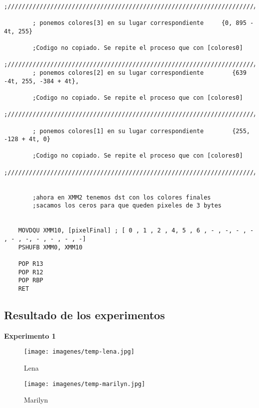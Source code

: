 \begin{codesnippet}
\begin{verbatim}
	;///////////////////////////////////////////////////////////////////////////////

        ; ponemos colores[3] en su lugar correspondiente     {0, 895 - 4t, 255}

        ;Codigo no copiado. Se repite el proceso que con [colores0]
	;//////////////////////////////////////////////////////////////////////////////
        ; ponemos colores[2] en su lugar correspondiente		{639 -4t, 255, -384 + 4t},	

        ;Codigo no copiado. Se repite el proceso que con [colores0]
	;///////////////////////////////////////////////////////////////////////////////

        ; ponemos colores[1] en su lugar correspondiente		{255, -128 + 4t, 0}

        ;Codigo no copiado. Se repite el proceso que con [colores0]
	;///////////////////////////////////////////////////////////////////////////////	
    
    
        ;ahora en XMM2 tenemos dst con los colores finales
        ;sacamos los ceros para que queden pixeles de 3 bytes
        
        
    MOVDQU XMM10, [pixelFinal] ; [ 0 , 1 , 2 , 4, 5 , 6 , - , -, - , - , - , -, - , - , - , -]
    PSHUFB XMM0, XMM10
    
    POP R13
    POP R12
    POP RBP
    RET
\end{verbatim}
\end{codesnippet}

\subsection{Resultado de los experimentos}
\vspace*{0.3cm} \noindent
\textbf{Experimento 1}

\begin{figure}
  \begin{center}
	\texttt{[image: imagenes/temp-lena.jpg]}
	\caption{Lena}
	\label{Lena}
  \end{center}
\end{figure}

\begin{figure}
  \begin{center}
	\texttt{[image: imagenes/temp-marilyn.jpg]}
	\caption{Marilyn}
	\label{Marilyn}
  \end{center}
\end{figure}


